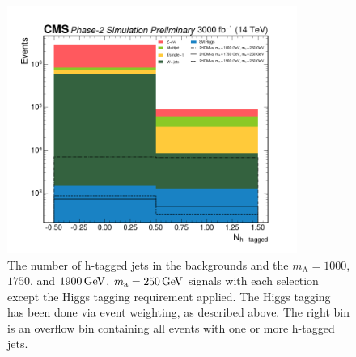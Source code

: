 \begin{figure}[ht]
\centering
\includegraphics[width=0.845\textwidth]{Chapters/Strategy/selections/NH_weight.png}
\caption{The number of h-tagged jets in the backgrounds and the $m_\mathrm{A} =1000$, $1750$, and $\GeV{1900}$, $m_\mathrm{a} = \GeV{250}$ signals with each selection except the Higgs tagging requirement applied. The Higgs tagging has been done via event weighting, as described above. The right bin is an overflow bin containing all events with one or more h-tagged jets.}
\label{fig:mt}
\end{figure}

